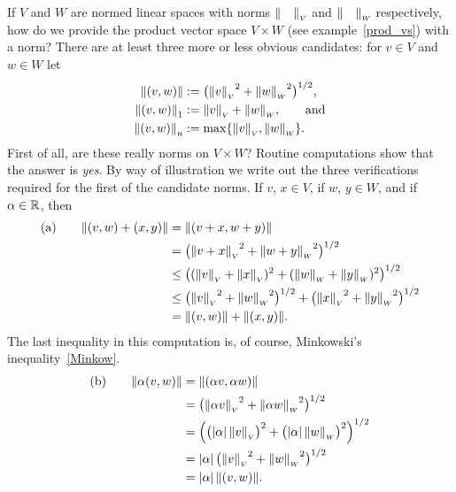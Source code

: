 If $V$ and $W$ are normed linear spaces with norms ${\lVert\quad\rVert}_{{\scriptscriptstyle{V}}}$ and
${\lVert\quad\rVert}_{{\scriptscriptstyle{W}}}$ respectively, how do we provide the product vector space $V \times
W$ (see example~\ref{prod_vs}) with a norm?  There are at least three more or less obvious
candidates: for $v \in V$ and $w \in W$ let
 \begin{align*}
       \lVert(v,w)\rVert &:= \bigl({{\lVert v\rVert}_{{\scriptscriptstyle{V}}}}^2 + {{\lVert w\rVert}_{{\scriptscriptstyle{W}}}}^2\bigr)^{1/2}, \\
   {\lVert(v,w)\rVert}_1 &:= {\lVert v\rVert}_{{\scriptscriptstyle{V}}} + {\lVert w\rVert}_{{\scriptscriptstyle{W}}}, \qquad\text{and} \\
   {\lVert(v,w)\rVert}_u &:= \max\{{\lVert v\rVert}_{{\scriptscriptstyle{V}}}, {\lVert w\rVert}_{{\scriptscriptstyle{W}}}\}.
 \end{align*}
First of all, are these really norms on $V \times W$?  Routine computations show that the
answer is \emph{yes}.  By way of illustration we write out the three verifications required
for the first of the candidate norms.  If $v$, $x \in V$, if $w$, $y \in W$, and if $\alpha
\in \mathbb{R}$, then
 \begin{align*}
     \text{(a)}\qquad \lVert(v,w) + (x,y)\rVert
                  &= \lVert(v + x, w + y)\rVert \\
                  &= \bigl({{\lVert v + x\rVert}_{{\scriptscriptstyle{V}}}}^2 + {{\lVert w + y\rVert}_{{\scriptscriptstyle{W}}}}^2\bigr)^{1/2} \\
                  &\le \bigl(({\lVert v\rVert}_{{\scriptscriptstyle{V}}} + {\lVert x\rVert}_{{\scriptscriptstyle{V}}})^2
                       + ({\lVert w\rVert}_{{\scriptscriptstyle{W}}} + {\lVert y\rVert}_{{\scriptscriptstyle{W}}})^2\bigr)^{1/2} \\
                  &\le \bigl({{\lVert v\rVert}_{{\scriptscriptstyle{V}}}}^2 + {{\lVert w\rVert}_{{\scriptscriptstyle{W}}}}^2\bigr)^{1/2}
                       + \bigl({{\lVert x\rVert}_{{\scriptscriptstyle{V}}}}^2 + {{\lVert y\rVert}_{{\scriptscriptstyle{W}}}}^2\bigr)^{1/2} \\
                  &= \lVert(v,w)\rVert + \lVert(x,y)\rVert.
 \end{align*}
The last inequality in this computation is, of course, Minkowski's inequality~\ref{Minkow}.
 \begin{align*}
   \text{(b)}\qquad \lVert\alpha(v,w)\rVert
              &= \lVert(\alpha v, \alpha w)\rVert \\
              &= \bigl({{\lVert\alpha v\rVert}_{{\scriptscriptstyle{V}}}}^2
                           + {{\lVert\alpha w\rVert}_{{\scriptscriptstyle{W}}}}^2\bigr)^{1/2} \\
              &= \left(\bigl(\lvert\alpha\rvert\, {\lVert v\rVert}_{{\scriptscriptstyle{V}}}\bigr)^2
                           + \bigl(\lvert\alpha\rvert\, {\lVert w\rVert}_{{\scriptscriptstyle{W}}}\bigr)^2\right)^{1/2} \\
              &= \lvert\alpha\rvert\,\bigl({{\lVert v\rVert}_{{\scriptscriptstyle{V}}}}^2
                           + {{\lVert w\rVert}_{{\scriptscriptstyle{W}}}}^2\bigr)^{1/2} \\
              &= \lvert\alpha\rvert\,\lVert(v,w)\rVert.
 \end{align*}

